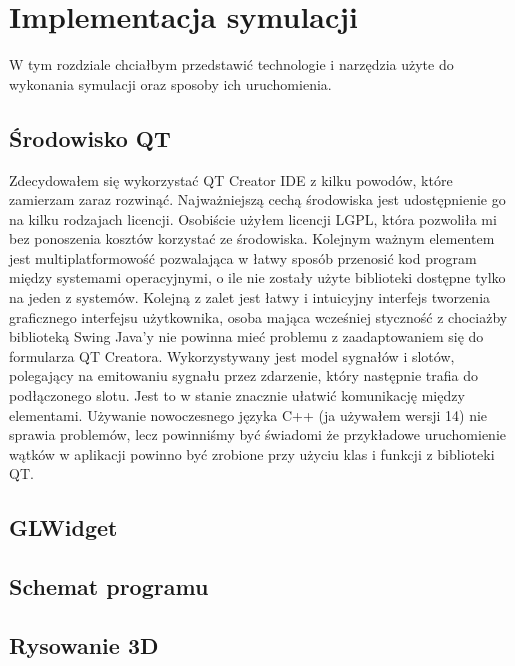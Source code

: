\chapter{Implementacja symulacji}
\label{cha:implementacja}

W tym rozdziale chciałbym przedstawić technologie i narzędzia użyte do wykonania symulacji oraz sposoby ich uruchomienia.


\section{Środowisko QT}
\label{sec:qt}
Zdecydowałem się wykorzystać QT Creator IDE z kilku powodów, które zamierzam zaraz rozwinąć. Najważniejszą cechą środowiska jest udostępnienie go na kilku rodzajach licencji. Osobiście użyłem licencji LGPL, która pozwoliła mi bez ponoszenia kosztów korzystać ze środowiska. Kolejnym ważnym elementem jest multiplatformowość pozwalająca w łatwy sposób przenosić kod program między systemami operacyjnymi, o ile nie zostały użyte biblioteki dostępne tylko na jeden z systemów. Kolejną z zalet jest łatwy i intuicyjny interfejs tworzenia graficznego interfejsu użytkownika, osoba mająca wcześniej styczność z chociażby biblioteką Swing Java'y nie powinna mieć problemu z zaadaptowaniem się do  formularza QT Creatora. Wykorzystywany jest model sygnałów i slotów, polegający na emitowaniu sygnału przez zdarzenie, który następnie trafia do podłączonego slotu. Jest to w stanie znacznie ułatwić komunikację między elementami. Używanie nowoczesnego języka C++ (ja używałem wersji 14) nie sprawia problemów, lecz powinniśmy być świadomi że przykładowe uruchomienie wątków w aplikacji powinno być zrobione przy użyciu klas i funkcji z biblioteki QT.



\section{GLWidget}
\label{sec:glwidget}

\section{Schemat programu}
\label{sec::schemat}


\section{Rysowanie 3D}
\label{sec::3d}

